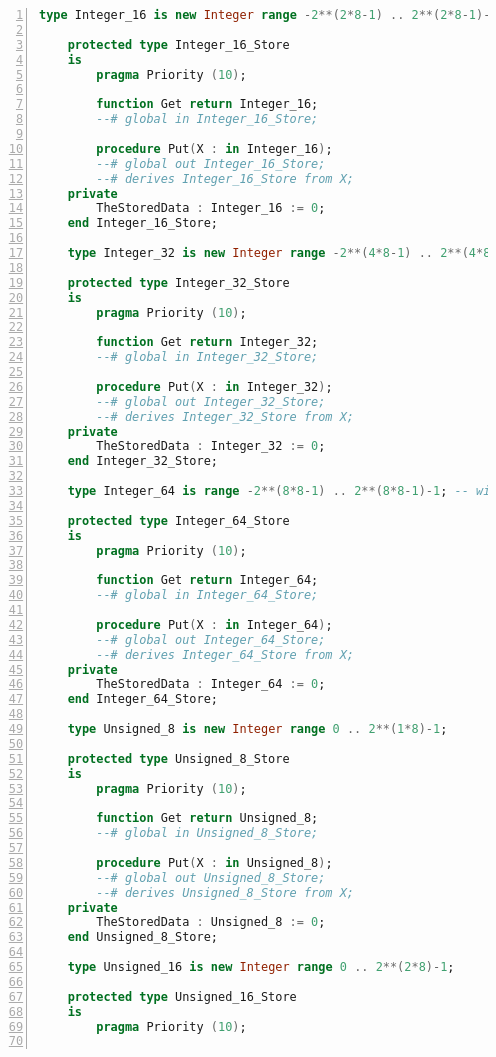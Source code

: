 \begin{lstlisting}[language=ada, gobble=0, numbers=left, caption={\lstinline{Base_Types} package}]
    type Integer_16 is new Integer range -2**(2*8-1) .. 2**(2*8-1)-1;

    protected type Integer_16_Store
    is
        pragma Priority (10);

        function Get return Integer_16;
        --# global in Integer_16_Store;

        procedure Put(X : in Integer_16);
        --# global out Integer_16_Store;
        --# derives Integer_16_Store from X;
    private
        TheStoredData : Integer_16 := 0;
    end Integer_16_Store;

    type Integer_32 is new Integer range -2**(4*8-1) .. 2**(4*8-1)-1;

    protected type Integer_32_Store
    is
        pragma Priority (10);

        function Get return Integer_32;
        --# global in Integer_32_Store;

        procedure Put(X : in Integer_32);
        --# global out Integer_32_Store;
        --# derives Integer_32_Store from X;
    private
        TheStoredData : Integer_32 := 0;
    end Integer_32_Store;

    type Integer_64 is range -2**(8*8-1) .. 2**(8*8-1)-1; -- with new Integer gnat compiler error: value not in range of type "Standard.Integer"

    protected type Integer_64_Store
    is
        pragma Priority (10);

        function Get return Integer_64;
        --# global in Integer_64_Store;

        procedure Put(X : in Integer_64);
        --# global out Integer_64_Store;
        --# derives Integer_64_Store from X;
    private
        TheStoredData : Integer_64 := 0;
    end Integer_64_Store;

    type Unsigned_8 is new Integer range 0 .. 2**(1*8)-1;

    protected type Unsigned_8_Store
    is
        pragma Priority (10);

        function Get return Unsigned_8;
        --# global in Unsigned_8_Store;

        procedure Put(X : in Unsigned_8);
        --# global out Unsigned_8_Store;
        --# derives Unsigned_8_Store from X;
    private
        TheStoredData : Unsigned_8 := 0;
    end Unsigned_8_Store;

    type Unsigned_16 is new Integer range 0 .. 2**(2*8)-1;

    protected type Unsigned_16_Store
    is
        pragma Priority (10);


\end{lstlisting}
